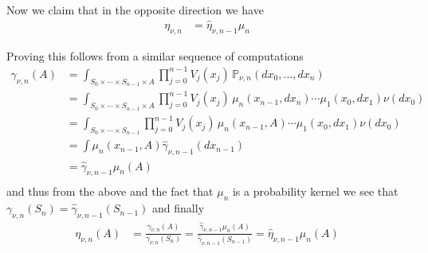 Now we claim that in the opposite direction we have
\begin{align*}
\eta_{\nu, n} &= \hat{\eta}_{\nu, n-1} \mu_n
\end{align*}

Proving this follows from a similar sequence of computations
\begin{align*}
\gamma_{\nu,n}(A) &= \int_{S_0 \times \dotsb \times S_{n-1} \times A} \prod_{j=0}^{n-1} V_j(x_j) \, \mathds{P}_{\nu, n}(dx_0, \dotsc, dx_n) \\
&= \int_{S_0 \times \dotsb \times S_{n-1} \times A} \prod_{j=0}^{n-1} V_j(x_j) \, \mu_n(x_{n-1}, dx_n) \dotsb \mu_1(x_0,dx_1) \nu(dx_0) \\
&= \int_{S_0 \times \dotsb \times S_{n-1} } \prod_{j=0}^{n-1} V_j(x_j) \, \mu_n(x_{n-1}, A) \dotsb \mu_1(x_0,dx_1) \nu(dx_0) \\
&= \int \mu_n(x_{n-1}, A) \hat{\gamma}_{\nu,n-1}(dx_{n-1}) \\
&= \hat{\gamma}_{\nu,n-1} \mu_n (A) \\
\end{align*}
and thus from the above and the fact that $\mu_n$ is a probability kernel we see that $\gamma_{\nu, n}(S_n) = \hat{\gamma}_{\nu,n-1}(S_{n-1})$ and finally
\begin{align*}
\eta_{\nu, n}(A) &= \frac{\gamma_{\nu,n}(A)}{\gamma_{\nu,n}(S_n)} = \frac{\hat{\gamma}_{\nu,n-1} \mu_n (A)}{\hat{\gamma}_{\nu,n-1} (S_{n-1})} = \hat{\eta}_{\nu,n-1} \mu_n (A)
\end{align*}

